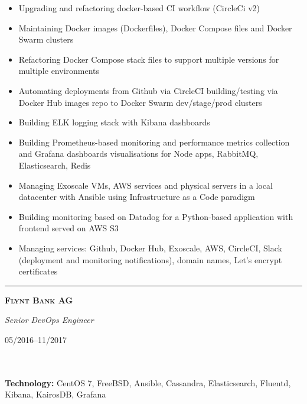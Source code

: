 \documentclass[$fontsize$, a4paper]{article}
\newcommand\textbox[1]{%
  \parbox{.333\textwidth}{#1}%
}
\begin{document}
\vspace{5pt}
\begin{itemize}
  \item Upgrading and refactoring docker-based CI workflow (CircleCi v2)
  \item Maintaining Docker images (Dockerfiles), Docker Compose files and Docker Swarm clusters
  \item Refactoring Docker Compose stack files to support multiple versions for multiple environments
  \item Automating deployments from Github via CircleCI building/testing via Docker Hub images repo to Docker Swarm dev/stage/prod clusters
  \item Building ELK logging stack with Kibana dashboards
  \item Building Prometheus-based monitoring and performance metrics collection and Grafana dashboards visualisations for Node apps, RabbitMQ, Elasticsearch, Redis
  \item Managing Exoscale VMs, AWS services and physical servers in a local datacenter with Ansible using Infrastructure as a Code paradigm
  \item Building monitoring based on Datadog for a Python-based application with frontend served on AWS S3
  \item Managing services: Github, Docker Hub, Exoscale, AWS, CircleCI, Slack (deployment and monitoring notifications), domain names, Let's encrypt certificates

\end{itemize}


\noindent\rule[0.5ex]{\linewidth}{1pt}

\noindent\textbox{\textbf{\textsc{Flynt Bank AG}}\hfill}\textbox{\hfil \emph{Senior DevOps Engineer}\hfil}\textbox{\hfill 05/2016--11/2017}\\\\
\textbf{Technology:} CentOS 7, FreeBSD, Ansible, Cassandra, Elasticsearch, Fluentd, Kibana, KairosDB, Grafana
\end{document}
